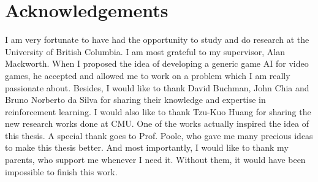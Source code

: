 
\chapter{Acknowledgements}

I am very fortunate to have had the opportunity to study and do research at
the University of British Columbia. I am most grateful to my supervisor, Alan Mackworth.
When I proposed the idea of developing a generic game AI for video games, he
accepted and allowed me to work on a problem which I am really passionate about.
Besides, I would like to thank David Buchman, John Chia and Bruno Norberto da Silva
for sharing their knowledge and expertise in reinforcement learning.
I would also like to thank Tzu-Kuo Huang for sharing
the new research works done at CMU. One of the works actually inspired
the idea of this thesis.
A special thank goes to Prof. Poole, who gave me many precious ideas to make this
thesis better.
And most importantly, I would like to thank my parents, who support
me whenever I need it. Without them, it would have been impossible to finish this work.




